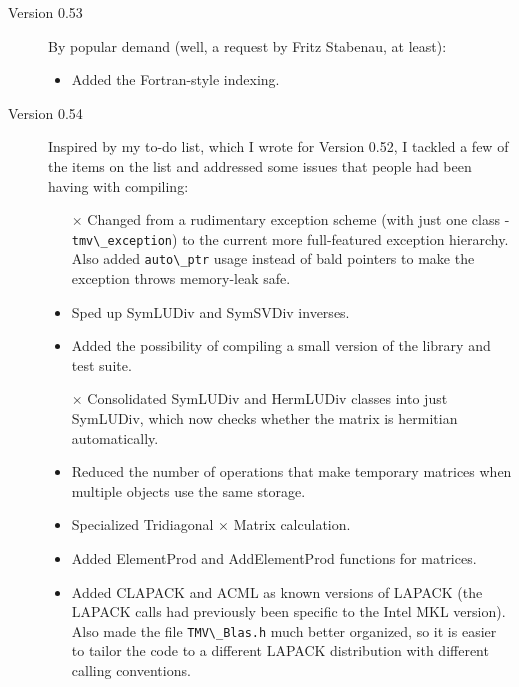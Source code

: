 \documentclass[twoside,letterpaper,11pt]{article}
\renewcommand{\tt}[1]{{\lstinline {#1}}}
\begin{document}
\begin{description}
\item[Version 0.53]
By popular demand (well, a request by Fritz Stabenau, at least):
\begin{itemize}
\item
Added the Fortran-style indexing.
\end{itemize}

\item[Version 0.54]
Inspired by my to-do list, which I wrote for Version 0.52, I tackled a few of the 
items on the list and addressed some issues that people had been having
with compiling:
\begin{itemize}
\item[$\times$]
Changed from a rudimentary exception scheme (with just one class - 
\tt{tmv\_exception}) to the current more full-featured exception hierarchy.
Also added \tt{auto\_ptr} usage instead of bald pointers to make the 
exception throws memory-leak safe.
\item
Sped up SymLUDiv and SymSVDiv inverses.
\item
Added the possibility of compiling a small version of the library and test suite.
\item[$\times$]
Consolidated SymLUDiv and HermLUDiv classes into just SymLUDiv, which now checks
whether the matrix is hermitian automatically.  
\item
Reduced the number of operations that make temporary matrices when multiple
objects use the same storage. 
\item
Specialized Tridiagonal $\times$ Matrix calculation.
\item
Added ElementProd and AddElementProd functions for matrices.
\item
Added CLAPACK and ACML as known versions of LAPACK (the LAPACK calls
had previously been specific to the Intel MKL version).  Also made the file
\tt{TMV\_Blas.h} much better organized, so it is easier to tailor the code to 
a different LAPACK distribution with different calling conventions.

\end{itemize}


\end{description}
\end{document}
